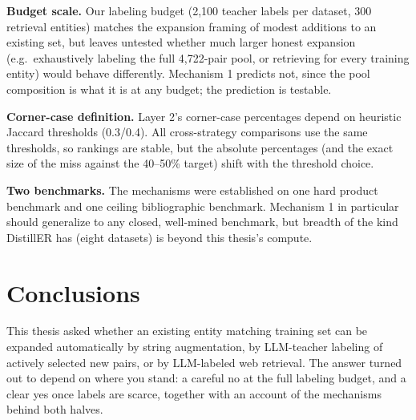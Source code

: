 \documentclass[a4paper,oneside,bibliography=totoc]{scrbook}
\begin{document}
\textbf{Budget scale.} Our labeling budget (2{,}100 teacher labels per dataset, 300 retrieval entities) matches the expansion framing of modest additions to an existing set, but leaves untested whether much larger honest expansion (e.g.\ exhaustively labeling the full 4{,}722-pair pool, or retrieving for every training entity) would behave differently. Mechanism 1 predicts not, since the pool composition is what it is at any budget; the prediction is testable.

\textbf{Corner-case definition.} Layer 2's corner-case percentages depend on heuristic Jaccard thresholds (0.3/0.4). All cross-strategy comparisons use the same thresholds, so rankings are stable, but the absolute percentages (and the exact size of the miss against the 40--50\% target) shift with the threshold choice.

\textbf{Two benchmarks.} The mechanisms were established on one hard product benchmark and one ceiling bibliographic benchmark. Mechanism 1 in particular should generalize to any closed, well-mined benchmark, but breadth of the kind DistillER has (eight datasets) is beyond this thesis's compute.

\chapter{Conclusions}
\label{ch:conclusions}

This thesis asked whether an existing entity matching training set can be expanded automatically by string augmentation, by LLM-teacher labeling of actively selected new pairs, or by LLM-labeled web retrieval. The answer turned out to depend on where you stand: a careful no at the full labeling budget, and a clear yes once labels are scarce, together with an account of the mechanisms behind both halves.
\end{document}

